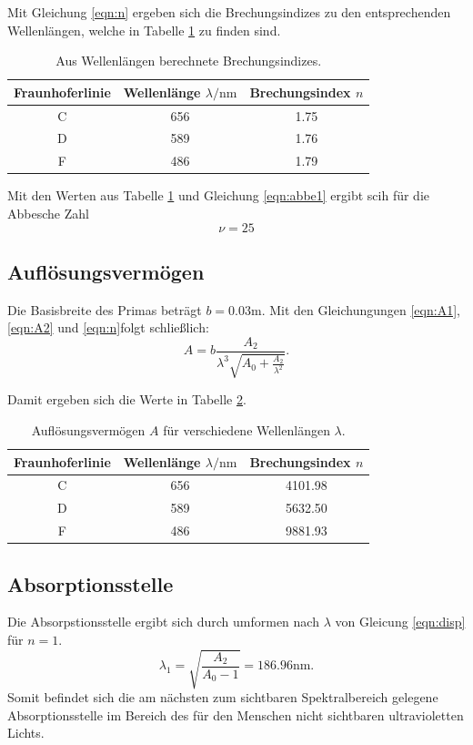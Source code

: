 Mit Gleichung \ref{eqn:n} ergeben sich die Brechungsindizes zu den entsprechenden Wellenlängen, welche in Tabelle \ref{tab:abbe} zu finden sind.

\begin{table}
  \caption{Aus Wellenlängen berechnete Brechungsindizes.}
  \centering
  \label{tab:abbe}
  \begin{tabular}{c c c}
  \toprule
  Fraunhoferlinie & Wellenlänge $\lambda /\si{\nano\meter}$ & Brechungsindex $n$\\
 \midrule
 C & 656 & 1.75 \\
 D & 589 & 1.76 \\
 F & 486 & 1.79 \\
 \bottomrule
 \end{tabular}
 \end{table}

 Mit den Werten aus Tabelle \ref{tab:abbe} und Gleichung \ref{eqn:abbe1} ergibt scih für die Abbesche Zahl
 \begin{equation}
   \nu = 25
\end{equation}

\subsection{Auflösungsvermögen}
Die Basisbreite des Primas beträgt $b=0.03\si{\meter}$. Mit  den Gleichungungen \ref{eqn:A1}, \ref{eqn:A2} und \ref{eqn:n}folgt schließlich:
\begin{equation}
A=b \frac{A_2}{\lambda^3 \sqrt{A_0+\frac{A_2}{\lambda^2}}}.
\end{equation}

Damit ergeben sich die Werte in Tabelle \ref{tab:aufloesung}.

\begin{table}
\caption{Auflösungsvermögen $A$ für verschiedene Wellenlängen $\lambda$.}
  \centering
  \label{tab:aufloesung}
  \begin{tabular}{c c c}
  \toprule
  Fraunhoferlinie & Wellenlänge $\lambda /\si{\nano\meter}$ & Brechungsindex $n$\\
 \midrule
 C & 656 & 4101.98 \\
 D & 589 & 5632.50 \\
 F & 486 & 9881.93 \\
 \bottomrule
 \end{tabular}
 \end{table}

 \subsection{Absorptionsstelle}
 Die Absorpstionsstelle ergibt sich durch umformen nach $\lambda$ von Gleicung \ref{eqn:disp} für $n=1$.
 \begin{equation}
   \lambda_1 = \sqrt{\frac{A_2}{A_0-1}} = 186.96 \si{\nano\meter}.
 \end{equation}
 Somit befindet sich die am nächsten zum sichtbaren Spektralbereich gelegene Absorptionsstelle im Bereich des für den Menschen nicht sichtbaren ultravioletten Lichts.
